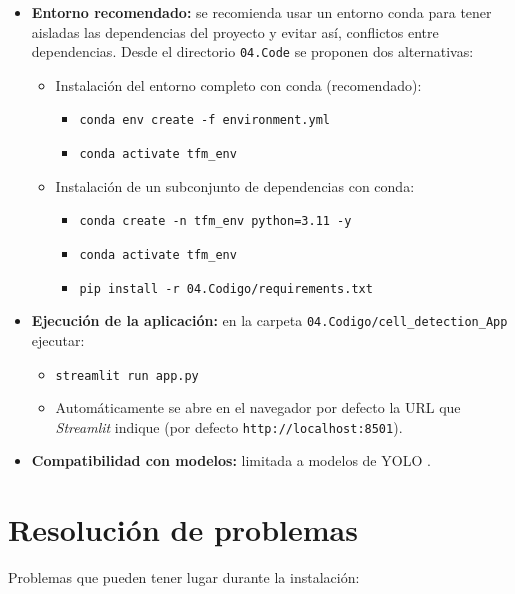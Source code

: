 \documentclass[12pt,a4paper,onecolumn,oneside]{report}
\begin{document}
\begin{itemize}
  \item \textbf{Entorno recomendado:} se recomienda usar un entorno conda para tener aisladas las dependencias del proyecto y evitar así, conflictos entre dependencias. 
  Desde el directorio \texttt{04.Code} se proponen dos alternativas:
    \begin{itemize}
      \item Instalación del entorno completo con conda (recomendado):
        \begin{itemize}
          \item \texttt{conda env create -f environment.yml}
          \item \texttt{conda activate tfm\_env}
        \end{itemize}
      \item Instalación de un subconjunto de dependencias con conda:
        \begin{itemize}
          \item \texttt{conda create -n tfm\_env python=3.11 -y}
          \item \texttt{conda activate tfm\_env}
          \item \texttt{pip install -r 04.Codigo/requirements.txt}
        \end{itemize}
    \end{itemize}
  \item \textbf{Ejecución de la aplicación:} en la carpeta \texttt{04.Codigo/cell\_detection\_App} ejecutar:
    \begin{itemize}
      \item \texttt{streamlit run app.py}
      \item Automáticamente se abre en el navegador por defecto la URL que \textit{Streamlit} indique (por defecto \texttt{http://localhost:8501}).
    \end{itemize}
  \item \textbf{Compatibilidad con modelos:} limitada a modelos de YOLO \cite{ultralytics_models}. 
\end{itemize}

\section{Resolución de problemas}
\label{sec:Resolución de problemas}

Problemas que pueden tener lugar durante la instalación:
\end{document}
